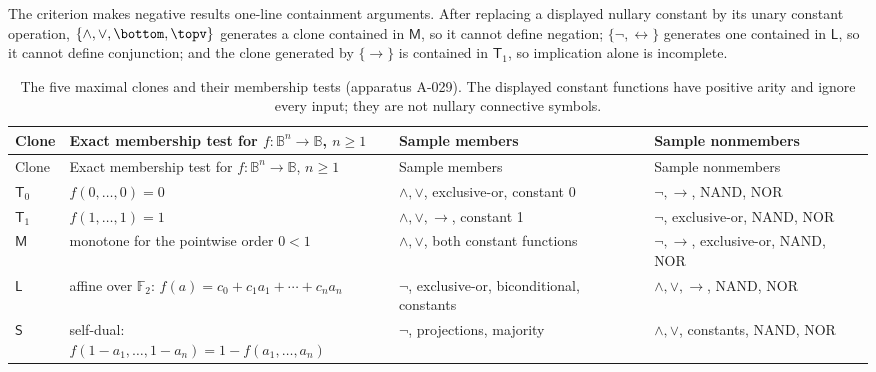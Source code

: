 The criterion makes negative results one-line containment arguments.  After
replacing a displayed nullary constant by its unary constant operation,
\(\{\land,\lor,\bottom,\topv\}\) generates a clone contained in
\(\mathsf M\), so it cannot define negation;
\(\{\neg,\leftrightarrow\}\) generates one contained in \(\mathsf L\), so
it cannot define conjunction; and the clone generated by \(\{\to\}\) is
contained in \(\mathsf T_1\), so implication alone is incomplete.

\begingroup\scriptsize
\begin{longtable}{@{}lp{}p{}p{}@{}}
\caption{The five maximal clones and their membership tests (apparatus A-029).
The displayed constant functions have positive arity and ignore every input;
they are not nullary connective symbols.}
\label{tab:p02-post-maximal-clones}\\
\toprule Clone & Exact membership test for \(f:\mathbb B^n\to\mathbb B\), \(n\geq1\)
 & Sample members & Sample nonmembers \\
\midrule\endfirsthead
\toprule Clone & Exact membership test for \(f:\mathbb B^n\to\mathbb B\), \(n\geq1\)
 & Sample members & Sample nonmembers \\
\midrule\endhead
\(\mathsf T_0\) & \(f(0,\ldots,0)=0\)
 & \(\land,\lor\), exclusive-or, constant 0 & \(\neg,\to\), NAND, NOR \\
\(\mathsf T_1\) & \(f(1,\ldots,1)=1\)
 & \(\land,\lor,\to\), constant 1 & \(\neg\), exclusive-or, NAND, NOR \\
\(\mathsf M\) & monotone for the pointwise order \(0<1\)
 & \(\land,\lor\), both constant functions & \(\neg,\to\), exclusive-or, NAND, NOR \\
\(\mathsf L\) & affine over \(\mathbb F_2\):
 \(f(a)=c_0+c_1a_1+\cdots+c_na_n\)
 & \(\neg\), exclusive-or, biconditional, constants & \(\land,\lor,\to\), NAND, NOR \\
\(\mathsf S\) & self-dual:
 \(f(1-a_1,\ldots,1-a_n)=1-f(a_1,\ldots,a_n)\)
 & \(\neg\), projections, majority & \(\land,\lor\), constants, NAND, NOR \\
\bottomrule
\end{longtable}
\endgroup

